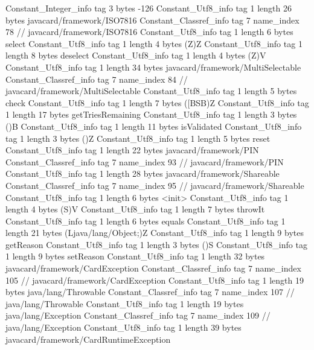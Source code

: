{{{		}
		Constant_Integer_info {
			tag	3
			bytes	-126
		}
		Constant_Utf8_info {
			tag	1
			length	26
			bytes	javacard/framework/ISO7816
		}
		Constant_Classref_info {
			tag	7
			name_index	78		// javacard/framework/ISO7816
		}
		Constant_Utf8_info {
			tag	1
			length	6
			bytes	select
		}
		Constant_Utf8_info {
			tag	1
			length	4
			bytes	(Z)Z
		}
		Constant_Utf8_info {
			tag	1
			length	8
			bytes	deselect
		}
		Constant_Utf8_info {
			tag	1
			length	4
			bytes	(Z)V
		}
		Constant_Utf8_info {
			tag	1
			length	34
			bytes	javacard/framework/MultiSelectable
		}
		Constant_Classref_info {
			tag	7
			name_index	84		// javacard/framework/MultiSelectable
		}
		Constant_Utf8_info {
			tag	1
			length	5
			bytes	check
		}
		Constant_Utf8_info {
			tag	1
			length	7
			bytes	([BSB)Z
		}
		Constant_Utf8_info {
			tag	1
			length	17
			bytes	getTriesRemaining
		}
		Constant_Utf8_info {
			tag	1
			length	3
			bytes	()B
		}
		Constant_Utf8_info {
			tag	1
			length	11
			bytes	isValidated
		}
		Constant_Utf8_info {
			tag	1
			length	3
			bytes	()Z
		}
		Constant_Utf8_info {
			tag	1
			length	5
			bytes	reset
		}
		Constant_Utf8_info {
			tag	1
			length	22
			bytes	javacard/framework/PIN
		}
		Constant_Classref_info {
			tag	7
			name_index	93		// javacard/framework/PIN
		}
		Constant_Utf8_info {
			tag	1
			length	28
			bytes	javacard/framework/Shareable
		}
		Constant_Classref_info {
			tag	7
			name_index	95		// javacard/framework/Shareable
		}
		Constant_Utf8_info {
			tag	1
			length	6
			bytes	<init>
		}
		Constant_Utf8_info {
			tag	1
			length	4
			bytes	(S)V
		}
		Constant_Utf8_info {
			tag	1
			length	7
			bytes	throwIt
		}
		Constant_Utf8_info {
			tag	1
			length	6
			bytes	equals
		}
		Constant_Utf8_info {
			tag	1
			length	21
			bytes	(Ljava/lang/Object;)Z
		}
		Constant_Utf8_info {
			tag	1
			length	9
			bytes	getReason
		}
		Constant_Utf8_info {
			tag	1
			length	3
			bytes	()S
		}
		Constant_Utf8_info {
			tag	1
			length	9
			bytes	setReason
		}
		Constant_Utf8_info {
			tag	1
			length	32
			bytes	javacard/framework/CardException
		}
		Constant_Classref_info {
			tag	7
			name_index	105		// javacard/framework/CardException
		}
		Constant_Utf8_info {
			tag	1
			length	19
			bytes	java/lang/Throwable
		}
		Constant_Classref_info {
			tag	7
			name_index	107		// java/lang/Throwable
		}
		Constant_Utf8_info {
			tag	1
			length	19
			bytes	java/lang/Exception
		}
		Constant_Classref_info {
			tag	7
			name_index	109		// java/lang/Exception
		}
		Constant_Utf8_info {
			tag	1
			length	39
			bytes	javacard/framework/CardRuntimeException
}}}
